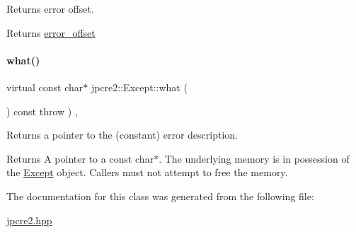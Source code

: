 Returns error offset. 

\begin{DoxyReturn}{Returns}
\hyperlink{classjpcre2_1_1Except_a12b09693ebee9b4a8b981ec1bd7506c4}{error\+\_\+offset} 
\end{DoxyReturn}
\hypertarget{classjpcre2_1_1Except_aa16bdec8432ee950955f7ad81a9655bb_aa16bdec8432ee950955f7ad81a9655bb}{}\label{classjpcre2_1_1Except_aa16bdec8432ee950955f7ad81a9655bb_aa16bdec8432ee950955f7ad81a9655bb} 
\paragraph{\texorpdfstring{what()}{what()}}
{\footnotesize\ttfamily virtual const char$\ast$ jpcre2\+::\+Except\+::what (\begin{DoxyParamCaption}{ }\end{DoxyParamCaption}) const throw  ) \hspace{0.3cm}{\ttfamily [inline]}, {\ttfamily [virtual]}}



Returns a pointer to the (constant) error description. 

\begin{DoxyReturn}{Returns}
A pointer to a const char$\ast$. The underlying memory is in possession of the \hyperlink{classjpcre2_1_1Except}{Except} object. Callers must not attempt to free the memory. 
\end{DoxyReturn}


The documentation for this class was generated from the following file\+:\begin{DoxyCompactItemize}
\item 
\hyperlink{jpcre2_8hpp}{jpcre2.\+hpp}\end{DoxyCompactItemize}
